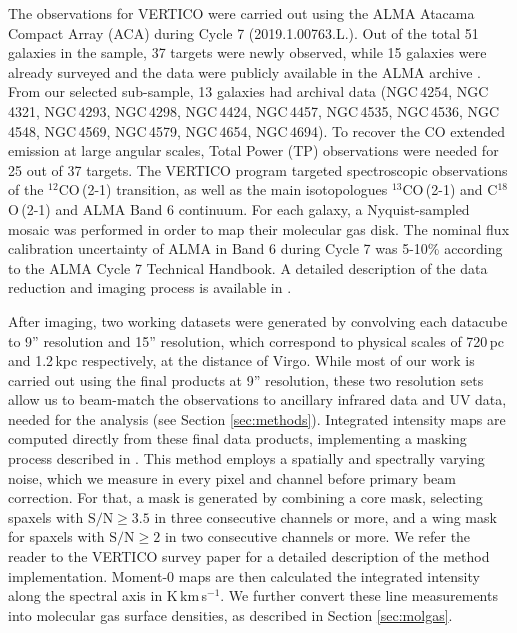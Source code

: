 \documentclass[longauth]{aa}
\begin{document}
The observations for VERTICO were carried out using the ALMA Atacama Compact Array (ACA) during Cycle 7 (2019.1.00763.L.). Out of the total 51 galaxies in the sample, 37 targets were newly observed, while 15 galaxies were already surveyed and the data were publicly available in the ALMA archive \citep{Cramer2020,Leroy2021a}. From our selected sub-sample, 13 galaxies had archival data (NGC\,4254, NGC\,4321, NGC\,4293, NGC\,4298, NGC\,4424, NGC\,4457, NGC\,4535, NGC\,4536, NGC\,4548, NGC\,4569, NGC\,4579, NGC\,4654, NGC\,4694). To recover the CO extended emission at large angular scales, Total Power (TP) observations were needed for 25 out of 37 targets. The VERTICO program targeted spectroscopic observations of the $^{12}$CO\,(2-1) transition, as well as the main isotopologues $^{13}$CO\,(2-1) and C$^{18}$O\,(2-1) and ALMA Band 6 continuum. For each galaxy, a Nyquist-sampled mosaic was performed in order to map their molecular gas disk. The nominal flux calibration uncertainty of ALMA in Band 6 during Cycle 7 was 5-10\% according to the ALMA Cycle 7 Technical Handbook. A detailed description of the data reduction and imaging process is available in \citet{Brown2021}.

After imaging, two working datasets were generated by convolving each datacube to 9” resolution and 15” resolution, which correspond to physical scales of 720\,pc and 1.2\,kpc respectively, at the distance of Virgo. While most of our work is carried out using the final products at 9” resolution, these two resolution sets allow us to beam-match the observations to ancillary infrared data and UV data, needed for the analysis (see Section \ref{sec:methods}). Integrated intensity maps are computed directly from these final data products, implementing a masking process described in \cite{Sun2018}. This method employs a spatially and spectrally varying noise, which we measure in every pixel and channel before primary beam correction. For that, a mask is generated by combining a core mask, selecting spaxels with $\mathrm{S/N}\geq 3.5$ in three consecutive channels or more, and a wing mask for spaxels with $\mathrm{S/N}\geq 2$ in two consecutive channels or more. We refer the reader to the VERTICO survey paper \cite{Brown2021} for a detailed description of the method implementation. Moment-$0$ maps are then calculated the integrated intensity along the spectral axis in K\,km\,s$^{-1}$. We further convert these line measurements into molecular gas surface densities, as described in Section \ref{sec:molgas}.
\end{document}
